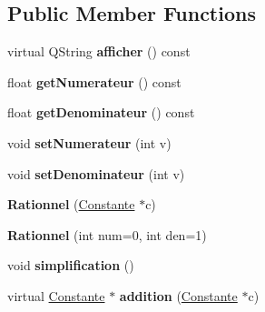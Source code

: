 \subsection*{\-Public \-Member \-Functions}
\begin{DoxyCompactItemize}
\item 
\hypertarget{class_rationnel_aef5b4fb13f34b03cdf9132c272b5144f}{virtual \-Q\-String {\bfseries afficher} () const }\label{class_rationnel_aef5b4fb13f34b03cdf9132c272b5144f}

\item 
\hypertarget{class_rationnel_a5802a9dda12b8af3ffef1eae3ee23d4a}{float {\bfseries get\-Numerateur} () const }\label{class_rationnel_a5802a9dda12b8af3ffef1eae3ee23d4a}

\item 
\hypertarget{class_rationnel_ae2a533befbdf1ec3977d36cd792af2ea}{float {\bfseries get\-Denominateur} () const }\label{class_rationnel_ae2a533befbdf1ec3977d36cd792af2ea}

\item 
\hypertarget{class_rationnel_ae96e448dcef2ceade17d42ddc58076bf}{void {\bfseries set\-Numerateur} (int v)}\label{class_rationnel_ae96e448dcef2ceade17d42ddc58076bf}

\item 
\hypertarget{class_rationnel_a09af735e39194e35ca2bfbaa6f8eb0b9}{void {\bfseries set\-Denominateur} (int v)}\label{class_rationnel_a09af735e39194e35ca2bfbaa6f8eb0b9}

\item 
\hypertarget{class_rationnel_a7e09e73d23a43aeb59086cabcd87381a}{{\bfseries \-Rationnel} (\hyperlink{class_constante}{\-Constante} $\ast$c)}\label{class_rationnel_a7e09e73d23a43aeb59086cabcd87381a}

\item 
\hypertarget{class_rationnel_abfbb081364b14280bd0dad5c446078d5}{{\bfseries \-Rationnel} (int num=0, int den=1)}\label{class_rationnel_abfbb081364b14280bd0dad5c446078d5}

\item 
\hypertarget{class_rationnel_a90d440a5d909748f5fda471e027e3a85}{void {\bfseries simplification} ()}\label{class_rationnel_a90d440a5d909748f5fda471e027e3a85}

\item 
\hypertarget{class_rationnel_a4dc6b238834ace05451e69ea2bb6d02a}{virtual \hyperlink{class_constante}{\-Constante} $\ast$ {\bfseries addition} (\hyperlink{class_constante}{\-Constante} $\ast$c)}\label{class_rationnel_a4dc6b238834ace05451e69ea2bb6d02a}


\end{DoxyCompactItemize}
